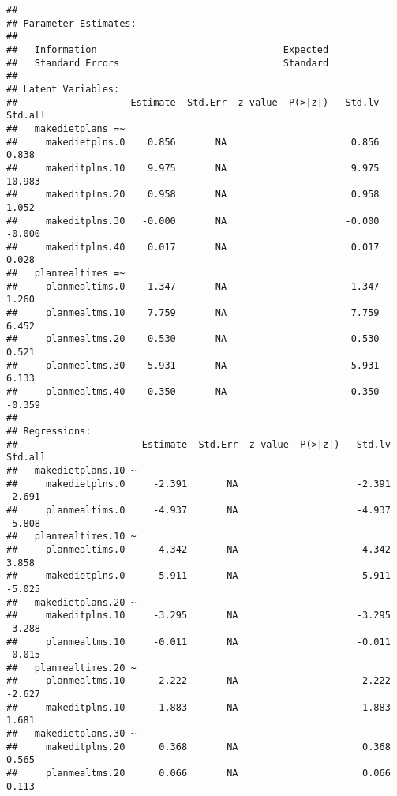 \documentclass{article}\usepackage[]{graphicx}\usepackage[]{color}
\makeatletter
\newenvironment{kframe}{%
 \def\at@end@of@kframe{}%
 \ifinner\ifhmode%
  \def\at@end@of@kframe{\end{minipage}}%
  \begin{minipage}{\columnwidth}%
 \fi\fi%
 \def\FrameCommand##1{\hskip\@totalleftmargin \hskip-\fboxsep
 \colorbox{shadecolor}{##1}\hskip-\fboxsep
     \hskip-\linewidth \hskip-\@totalleftmargin \hskip\columnwidth}%
 \MakeFramed {\advance\hsize-\width
   \@totalleftmargin\z@ \linewidth\hsize
   \@setminipage}}%
 {\par\unskip\endMakeFramed%
 \at@end@of@kframe}
\newenvironment{knitrout}{}{} %
\makeatother
\begin{document}
\begin{knitrout}
\begin{kframe}
{\ttfamily\noindent\color{warningcolor}{\#\# Warning in .local(object, ...): lavaan WARNING: fit measures not available if model did not converge}}\begin{verbatim}
## 
## Parameter Estimates:
## 
##   Information                                 Expected
##   Standard Errors                             Standard
## 
## Latent Variables:
##                    Estimate  Std.Err  z-value  P(>|z|)   Std.lv  Std.all
##   makedietplans =~                                                      
##     makedietplns.0    0.856       NA                      0.856    0.838
##     makeditplns.10    9.975       NA                      9.975   10.983
##     makeditplns.20    0.958       NA                      0.958    1.052
##     makeditplns.30   -0.000       NA                     -0.000   -0.000
##     makeditplns.40    0.017       NA                      0.017    0.028
##   planmealtimes =~                                                      
##     planmealtims.0    1.347       NA                      1.347    1.260
##     planmealtms.10    7.759       NA                      7.759    6.452
##     planmealtms.20    0.530       NA                      0.530    0.521
##     planmealtms.30    5.931       NA                      5.931    6.133
##     planmealtms.40   -0.350       NA                     -0.350   -0.359
## 
## Regressions:
##                      Estimate  Std.Err  z-value  P(>|z|)   Std.lv  Std.all
##   makedietplans.10 ~                                                      
##     makedietplns.0     -2.391       NA                     -2.391   -2.691
##     planmealtims.0     -4.937       NA                     -4.937   -5.808
##   planmealtimes.10 ~                                                      
##     planmealtims.0      4.342       NA                      4.342    3.858
##     makedietplns.0     -5.911       NA                     -5.911   -5.025
##   makedietplans.20 ~                                                      
##     makeditplns.10     -3.295       NA                     -3.295   -3.288
##     planmealtms.10     -0.011       NA                     -0.011   -0.015
##   planmealtimes.20 ~                                                      
##     planmealtms.10     -2.222       NA                     -2.222   -2.627
##     makeditplns.10      1.883       NA                      1.883    1.681
##   makedietplans.30 ~                                                      
##     makeditplns.20      0.368       NA                      0.368    0.565
##     planmealtms.20      0.066       NA                      0.066    0.113

\end{verbatim}
\end{kframe}
\end{knitrout}
\end{document}
